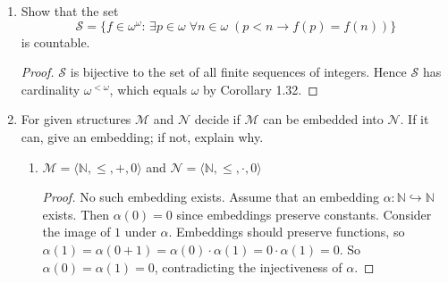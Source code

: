\documentclass{article}
\newcommand{\TODO}[1]{\textcolor{red}{TODO: #1}}
\begin{document}
\begin{enumerate}
    \begin{proof}
      \TODO{Argument may not hold if CH does not hold.}
      $\mathcal{S}$ is the set of monotonically increasing countable
      sequences of integers. Since $\mathcal{S}$ is a subset of
      $\omega^\omega$ which has cardinality $|2^\omega|$ from Corollary
      1.31, the cardinality of $\mathcal{S}$ must be smaller or equal to
      $|2^\omega|$. Hence it remains to show that $|\mathcal{S}|>\omega$.
      To prove that, it suffices to show that $\omega$ cannot enumerate
      $\mathcal{S}$. We prove this by using Cantor's diagonal argument.
      Assume that $\{f_i\}_{i\in\omega}$ enumerates $\mathcal{S}$. We
      inductively construct a new monotonically increasing function $f$
      that does not belong to any $f_i$'s, as follows: Set $f(0)=f_0(0)+1$.
      For each $n\in\omega$, set $f(n+1)=\max(f(n),f_n(n))+1$. By
      construction, $f$ cannot equal to any of the $f_i$'s in $\mathcal{S}$
      because $f(i)>f_i(i)$. Hence no countable enumeration of
      $\mathcal{S}$ exists.
    \end{proof}

  \item Show that the set
    \begin{equation*}
      \mathcal{S}=\{f\in\omega^\omega:\, \exists p\in\omega\; \forall
      n\in\omega\; (p<n\rightarrow f(p)=f(n))\}
    \end{equation*}
    is countable.

    \begin{proof}
      $\mathcal{S}$ is bijective to the set of all finite sequences of
      integers. Hence $\mathcal{S}$ has cardinality $\omega^{<\omega}$,
      which equals $\omega$ by Corollary 1.32.
    \end{proof}

  \item For given structures $\mathscr{M}$ and $\mathscr{N}$ decide if
    $\mathscr{M}$ can be embedded into $\mathscr{N}$. If it can, give an
    embedding; if not, explain why.

    \begin{enumerate}
      \item $\mathscr{M}=\langle\mathbb{N},\leq,+,0\rangle$ and
        $\mathscr{N}=\langle\mathbb{N},\leq,\cdot,0\rangle$
        \begin{proof}
          No such embedding exists. Assume that an embedding
          $\alpha:\mathbb{N}\hookrightarrow\mathbb{N}$ exists. Then
          $\alpha(0)=0$ since embeddings preserve constants. Consider the
          image of $1$ under $\alpha$. Embeddings should preserve
          functions, so
          $\alpha(1)=\alpha(0+1)=\alpha(0)\cdot\alpha(1)=0\cdot\alpha(1)=0$.
          So $\alpha(0)=\alpha(1)=0$, contradicting the injectiveness of
          $\alpha$.
        \end{proof}


\end{enumerate}
\end{enumerate}
\end{document}
